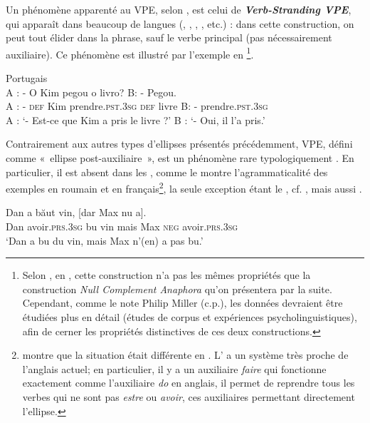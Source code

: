 Un phénomène apparenté au VPE, selon \citet{Goldberg2005}, est celui de \textbf{\textit{Verb-Stranding VPE}}, qui apparaît dans beaucoup de langues (, , , , etc.) : dans cette construction, on peut tout élider dans la phrase, sauf le verbe principal (pas nécessairement auxiliaire). Ce phénomène est illustré par l’exemple  en \footnote{Selon \citet{CyrinoEtAl2002}, en , cette construction n’a pas les mêmes propriétés que la construction \textit{Null Complement Anaphora} qu’on présentera par la suite. Cependant, comme le note Philip Miller (c.p.), les données devraient être étudiées plus en détail (études de corpus et expériences psycholinguistiques), afin de cerner les propriétés distinctives de ces deux constructions.}.

\ea \label{ch1:ex60}
Portugais\\
\gll A : -  O  Kim  pegou  o  livro?  B: -  Pegou.\\
  A : - \textsc{def}  Kim  prendre.\textsc{pst.3sg} \textsc{def}  livre B: - prendre.\textsc{pst.3sg}\\
\glt  A : ‘- Est-ce que Kim a pris le livre ?’  B : ‘- Oui, il l’a pris.’
\z

 
Contrairement aux autres types d’ellipses présentés précédemment, VPE, dé\-fini comme «~ellipse post-auxiliaire~», est un phénomène rare typologiquement \citep{Goldberg2005}. En particulier, il est absent dans les  \citep{Lobeck1995}, comme le montre l’agrammaticalité des exemples  en roumain et  en français\footnote{\citet{Miller1997a} montre que la situation était différente en . L' a un système très proche de l'anglais actuel; en particulier, il y a un auxiliaire \textit{faire} qui fonctionne exactement comme l'auxiliaire \textit{do} en anglais, {\cad} il permet de reprendre tous les verbes qui ne sont pas \textit{estre} ou \textit{avoir}, ces auxiliaires permettant directement l'ellipse.}, la seule exception étant le  , cf. \citet{CyrinoEtAl2002}, mais aussi \citet{Martins2005}. 

\ea
\ea
\gll  *Dan  a  băut  vin,  [dar  Max  nu  a]. \label{ch1:ex61a}\\
Dan  avoir\textsc{.prs.3sg}   bu  vin  mais  Max  \textsc{neg}  avoir\textsc{.prs.3sg} \\
\glt ‘Dan a bu du vin, mais Max n’(en) a pas bu.’ 

